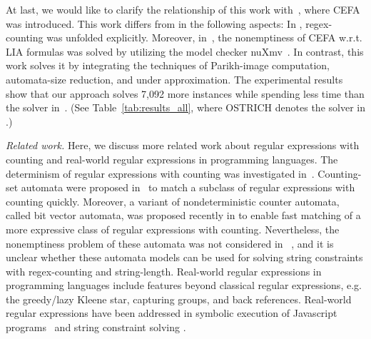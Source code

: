 At last, we would like to clarify the relationship of this work with~\cite{atva2020}, where CEFA was introduced. This work differs from \cite{atva2020} in the following aspects: In \cite{atva2020}, regex-counting was unfolded explicitly. Moreover, in~\cite{atva2020}, the nonemptiness of CEFA w.r.t. LIA formulas was solved by utilizing the model checker nuXmv~\cite{nuxmv}. In contrast, this work solves it by integrating the techniques of Parikh-image computation, automata-size reduction, and under approximation. The experimental results show that our approach solves 7,092 more instances while spending less time than the solver in~\cite{atva2020}. (See Table~\ref{tab:results_all}, where OSTRICH denotes the solver in \cite{atva2020}.)

\medskip
\noindent
\emph{Related work.} 
Here, we discuss more related work about regular expressions with counting and real-world regular expressions in programming languages.  
The determinism of regular expressions with counting was investigated in~\cite{GGM12,CL15}. Counting-set automata were proposed in~\cite{redos_lenka,HS+23} to match a subclass of regular expressions with counting quickly. Moreover, a variant of nondeterministic counter automata, called bit vector automata, was proposed recently in \cite{GKM23} to enable fast matching of a more expressive class of regular expressions with counting.   Nevertheless, the nonemptiness problem of these automata was not considered in ~\cite{redos_lenka,HS+23,GKM23}, and it is unclear whether these automata models can be used for solving string constraints with regex-counting and string-length.
Real-world regular expressions in programming languages include features beyond classical regular expressions, e.g. the greedy/lazy Kleene star, capturing groups, and back references. Real-world regular expressions have been addressed in symbolic execution of Javascript programs~\cite{LMK19} and string constraint solving \cite{CF+22}. 


